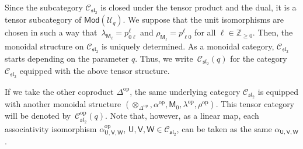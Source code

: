 \documentclass[10pt,a4paper]{amsart}
\numberwithin{equation}{section}
\newcommand{\catMod}{\mathsf{Mod}}
\newcommand{\op}{\mathrm{op}}
\newcommand{\bZ}{\mathbb{Z}}
\newcommand{\cC}{\mathcal{C}}
\newcommand{\cU}{\mathcal{U}}
\newcommand{\fsl}{\mathfrak{sl}}
\newcommand{\sfM}{\mathsf{M}}
\newcommand{\sfU}{\mathsf{U}}
\newcommand{\sfV}{\mathsf{V}}
\newcommand{\sfW}{\mathsf{W}}
\newcommand{\UEA}{\cU}
\newcommand{\Uq}{\UEA_{q}}
\newcommand{\QGirrep}[1]{\sfM_{#1}}
\newcommand{\QGcoprod}{\Delta}
\newcommand{\CGproj}[3]{p^{#1}_{#2 #3}}
\newcommand{\catQG}{\cC_{\fsl_{2}}}
\newcommand{\QGrepU}{\sfU}
\newcommand{\QGrepV}{\sfV}
\newcommand{\QGrepW}{\sfW}
\begin{document}
Since the subcategory $\catQG$ is closed under the tensor product and the dual, it is a tensor subcategory of $\catMod (\Uq)$.
We suppose that the unit isomorphisms are chosen in such a way that~${\lambda_{\QGirrep{\ell}}=\CGproj{\ell}{0}{\ell}}$ and $\rho_{\QGirrep{\ell}}=\CGproj{\ell}{\ell}{0}$ for all $\ell\in\bZ_{\geq 0}$.
Then, the monoidal structure on $\catQG$ is uniquely determined.
As a monoidal category, $\catQG$ starts depending on the parameter $q$.
Thus, we write~$\catQG (q)$ for the category $\catQG$ equipped with the above tensor structure.

If we take the other coproduct $\QGcoprod^{\op}$, the same underlying category $\catQG$ is equipped with another monoidal structure $(\otimes_{\QGcoprod^{\op}},\alpha^{\op},\QGirrep{0},\lambda^{\op},\rho^{\op})$.
This tensor category will be denoted by~$\catQG^{\op}(q)$.
Note that, however, as a linear map, each associativity isomorphism $\alpha^{\op}_{\QGrepU,\QGrepV,\QGrepW}$, $\QGrepU,\QGrepV,\QGrepW\in \catQG$, can be taken as the same $\alpha_{\QGrepU,\QGrepV,\QGrepW}$.
\end{document}
